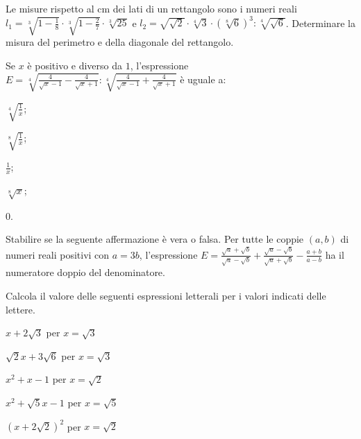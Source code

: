 \begin{esercizio}%
Le misure rispetto al cm dei lati di un rettangolo sono i numeri reali $l_1=\sqrt[3]{1-\frac 1 8}\cdot \sqrt[3]{1-\frac 2 7}\cdot \sqrt[3]{25}$ e $l_2=\sqrt{\sqrt 2}\cdot \sqrt[4]3\cdot (\sqrt[8]6)^3:\sqrt[4]{\sqrt 6}$. Determinare la misura del perimetro e della diagonale del rettangolo.
\end{esercizio}

\begin{esercizio}%
Se $x$ è positivo e diverso da $1$, l'espressione $E=\sqrt[4]{\frac 4{\sqrt x-1}-\frac 4{\sqrt x+1}}:\sqrt[4]{\frac 4{\sqrt x-1}+\frac 4{\sqrt x+1}}$ è uguale a:
\begin{multicols}{5}
\begin{enumeratea}
 \item $\sqrt[4]{\frac 1 x}$;
 \item $\sqrt[8]{\frac 1 x}$;
 \item $\frac 1 x$;
 \item $\sqrt[8]x$;
 \item $0$.
\end{enumeratea}
\end{multicols}
\end{esercizio}

\begin{esercizio}%
Stabilire se la seguente affermazione è vera o falsa. Per tutte le coppie $(a,b)$ di numeri reali positivi con $a=3b$, l'espressione $E=\frac{\sqrt a+\sqrt b}{\sqrt a-\sqrt b}+\frac{\sqrt a-\sqrt b}{\sqrt a+\sqrt b}-\frac{a+b}{a-b}$ ha il numeratore doppio del denominatore.
\end{esercizio}

\begin{esercizio}%
Calcola il valore delle seguenti espressioni letterali per i valori indicati delle lettere.
\begin{multicols}{3}
\begin{enumeratea}
\item $x+2\sqrt 3$ per $x=\sqrt 3$
\item $\sqrt 2x+3\sqrt 6$ per $x=\sqrt{3}$
\item $x^2+x-1$ per $x=\sqrt 2$
\item $x^2+\sqrt 5x-1$ per $x=\sqrt 5$
\item $(x+2\sqrt 2)^2$ per $x=\sqrt 2$
\end{enumeratea}
\end{multicols}
\end{esercizio}

